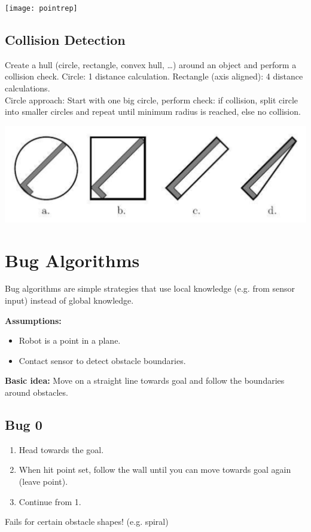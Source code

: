 \begin{multicols*}{2}
\begin{center}
\texttt{[image: pointrep]}
\end{center}

\subsection{Collision Detection}
Create a hull (circle, rectangle, convex hull, …) around an object and
perform a collision check. Circle: 1 distance calculation. Rectangle (axis aligned): 4 distance calculations.\\
Circle approach: Start with one big circle, perform check: if collision, split circle into smaller circles and repeat until minimum radius is reached, else no collision.

\begin{center}
\includegraphics[width=\columnwidth]{collision_hull.png}
\end{center}

\section{Bug Algorithms}
Bug algorithms are simple strategies that use local knowledge (e.g. from sensor input) instead of global knowledge.\par

\textbf{Assumptions:}
\begin{itemize}
	\item Robot is a point in a plane.
	\item Contact sensor to detect obstacle boundaries.
\end{itemize}

\textbf{Basic idea:} Move on a straight line towards goal and follow the boundaries around obstacles.

\subsection{Bug 0}
\begin{enumerate}
	\item Head towards the goal.
	\item When hit point set, follow the wall until you can move towards goal again (leave point).
	\item Continue from 1.
\end{enumerate}
Fails for certain obstacle shapes! (e.g. spiral)


\end{multicols*}

